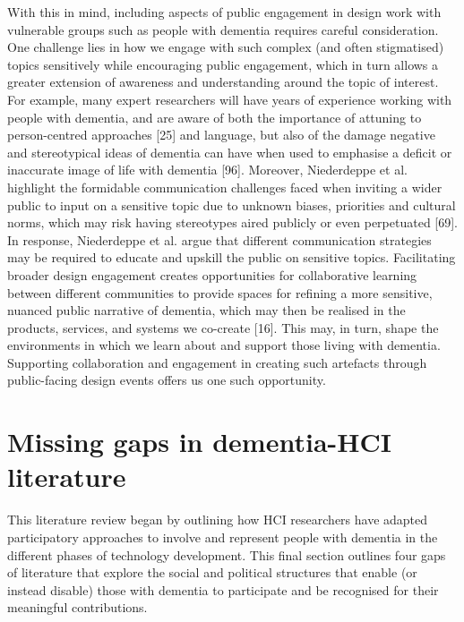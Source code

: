 With this in mind, including aspects of public engagement in design work with vulnerable groups such as people with dementia requires careful consideration. One challenge lies in how we engage with such complex (and often stigmatised) topics sensitively while encouraging public engagement, which in turn allows a greater extension of awareness and understanding around the topic of interest. For example, many expert researchers will have years of experience working with people with dementia, and are aware of both the importance of attuning to person-centred approaches [25] and language, but also of the damage negative and stereotypical ideas of dementia can have when used to emphasise a deficit or inaccurate image of life with dementia [96]. Moreover, Niederdeppe et al. highlight the formidable communication challenges faced when inviting a wider public to input on a sensitive topic due to unknown biases, priorities and cultural norms, which may risk having stereotypes aired publicly or even perpetuated [69]. In response, Niederdeppe et al. argue that different communication strategies may be required to educate and upskill the public on sensitive topics.
 Facilitating broader design engagement creates opportunities for collaborative learning between different communities to provide spaces for refining a more sensitive, nuanced public narrative of dementia, which may then be realised in the products, services, and systems we co-create [16]. This may, in turn, shape the environments in which we learn about and support those living with dementia. Supporting collaboration and engagement in creating such artefacts through public-facing design events offers us one such opportunity. 



\section{Missing gaps in dementia-HCI literature}
\label{BL:Missing-gaps}
This literature review began by outlining how HCI researchers have adapted participatory approaches to involve and represent people with dementia in the different phases of technology development. This final section outlines four gaps of literature that explore the social and political structures that enable (or instead disable) those with dementia to participate and be recognised for their meaningful contributions. 


